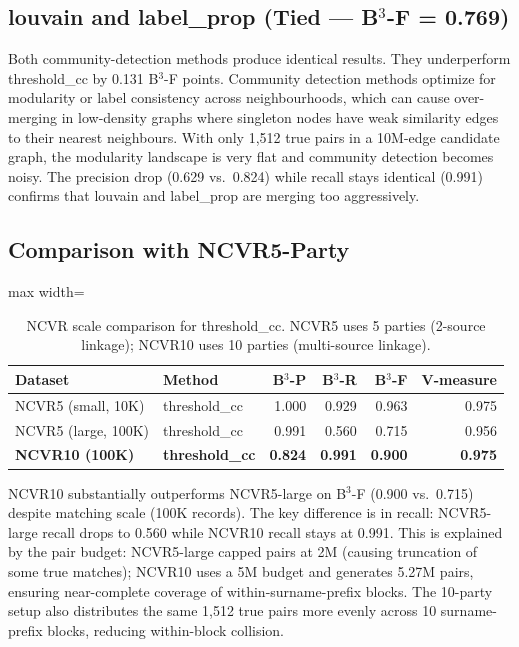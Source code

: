 \documentclass[11pt, a4paper]{article}
\begin{document}
\subsection*{louvain and label\_prop (Tied --- B$^3$-F = 0.769)}

Both community-detection methods produce identical results. They underperform
threshold\_cc by 0.131 B$^3$-F points. Community detection methods optimize for
modularity or label consistency across neighbourhoods, which can cause over-merging
in low-density graphs where singleton nodes have weak similarity edges to their
nearest neighbours. With only 1,512 true pairs in a 10M-edge candidate graph,
the modularity landscape is very flat and community detection becomes noisy.
The precision drop (0.629 vs.\ 0.824) while recall stays identical (0.991)
confirms that louvain and label\_prop are merging too aggressively.

\subsection*{Comparison with NCVR5-Party}

\begin{table}[h!]
\centering
\begin{adjustbox}{max width=\linewidth}
\begin{tabular}{llrrrr}
\toprule
\textbf{Dataset} & \textbf{Method} & \textbf{B$^3$-P} & \textbf{B$^3$-R} & \textbf{B$^3$-F} & \textbf{V-measure} \\
\midrule
NCVR5 (small, 10K)   & threshold\_cc   & 1.000 & 0.929 & 0.963 & 0.975 \\
NCVR5 (large, 100K)  & threshold\_cc   & 0.991 & 0.560 & 0.715 & 0.956 \\
\textbf{NCVR10 (100K)}& \textbf{threshold\_cc} & \textbf{0.824} & \textbf{0.991} & \textbf{0.900} & \textbf{0.975} \\
\bottomrule
\end{tabular}
\end{adjustbox}
\caption{NCVR scale comparison for threshold\_cc. NCVR5 uses 5 parties (2-source linkage);
NCVR10 uses 10 parties (multi-source linkage).}
\end{table}

NCVR10 substantially outperforms NCVR5-large on B$^3$-F (0.900 vs.\ 0.715) despite
matching scale (100K records). The key difference is in recall: NCVR5-large recall
drops to 0.560 while NCVR10 recall stays at 0.991. This is explained by the pair
budget: NCVR5-large capped pairs at 2M (causing truncation of some true matches);
NCVR10 uses a 5M budget and generates 5.27M pairs, ensuring near-complete coverage
of within-surname-prefix blocks. The 10-party setup also distributes the same
1,512 true pairs more evenly across 10 surname-prefix blocks, reducing within-block
collision.
\end{document}
